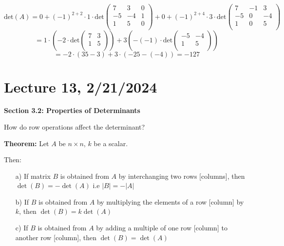 \documentclass{article}
\begin{document}
\[
\text{det}(A) = 0 + (-1)^{2+2} \cdot 1 \cdot \text{det}
\begin{pmatrix}
7 & 3 & 0 \\
-5 & -4 & 1 \\
1 & 5 & 0 \\
\end{pmatrix}
+ 0 + (-1)^{2+4} \cdot 3 \cdot \text{det} 
\begin{pmatrix}
7 & -1 & 3 \\
-5 & 0 & -4 \\
1 & 0 & 5 \\
\end{pmatrix}
\]
\[
= 1 \cdot (-2 \cdot \text{det} 
\begin{pmatrix}
7 & 3 \\
1 & 5 \\
\end{pmatrix}) 
+3(-(-1) \cdot \text{det} 
\begin{pmatrix}
-5 & -4 \\
1 & 5 \\
\end{pmatrix}) 
\]
\[
= -2 \cdot (35-3)+3\cdot(-25-(-4)) 
= -127
\]



\section{Lecture 13, 2/21/2024}

\textbf{Section 3.2: Properties of Determinants}

How do row operations affect the determinant?

\textbf{Theorem:} Let \( A \) be \( n \times n \), \( k \) be a scalar.

Then:

\begin{itemize}
    \item[a)] If matrix \( B \) is obtained from \( A \) by interchanging two rows [columns], then \( \det(B) = -\det(A) \) i.e \( |B| = -|A| \)
    
    \item[b)] If \( B \) is obtained from \( A \) by multiplying the elements of a row [column] by \( k \), then \( \det(B) = k \det(A) \)
    
    \item[c)] If \( B \) is obtained from \( A \) by adding a multiple of one row [column] to another row [column], then \( \det(B) = \det(A) \)
\end{itemize}
\end{document}
